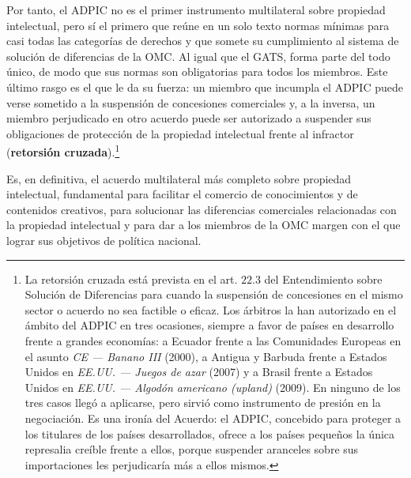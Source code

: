 \documentclass[10pt,a4paper]{article}
\begin{document}
Por tanto, el ADPIC no es el primer instrumento multilateral sobre propiedad intelectual, pero sí el primero que reúne en un solo texto normas mínimas para casi todas las categorías de derechos y que somete su cumplimiento al sistema de solución de diferencias de la OMC. Al igual que el GATS, forma parte del todo único, de modo que sus normas son obligatorias para todos los miembros. Este último rasgo es el que le da su fuerza: un miembro que incumpla el ADPIC puede verse sometido a la suspensión de concesiones comerciales y, a la inversa, un miembro perjudicado en otro acuerdo puede ser autorizado a suspender sus obligaciones de protección de la propiedad intelectual frente al infractor (\textbf{retorsión cruzada}).\footnote{%
  La retorsión cruzada está prevista en el art. $22.3$ del Entendimiento sobre Solución de Diferencias para cuando la suspensión de concesiones en el mismo sector o acuerdo no sea factible o eficaz. Los árbitros la han autorizado en el ámbito del ADPIC en tres ocasiones, siempre a favor de países en desarrollo frente a grandes economías: a Ecuador frente a las Comunidades Europeas en el asunto \textit{CE --- Banano III} (2000), a Antigua y Barbuda frente a Estados Unidos en \textit{EE.UU. --- Juegos de azar} (2007) y a Brasil frente a Estados Unidos en \textit{EE.UU. --- Algodón americano (upland)} (2009). En ninguno de los tres casos llegó a aplicarse, pero sirvió como instrumento de presión en la negociación. Es una ironía del Acuerdo: el ADPIC, concebido para proteger a los titulares de los países desarrollados, ofrece a los países pequeños la única represalia creíble frente a ellos, porque suspender aranceles sobre sus importaciones les perjudicaría más a ellos mismos.
}

Es, en definitiva, el acuerdo multilateral más completo sobre propiedad intelectual, fundamental para facilitar el comercio de conocimientos y de contenidos creativos, para solucionar las diferencias comerciales relacionadas con la propiedad intelectual y para dar a los miembros de la OMC margen con el que lograr sus objetivos de política nacional.
\end{document}
